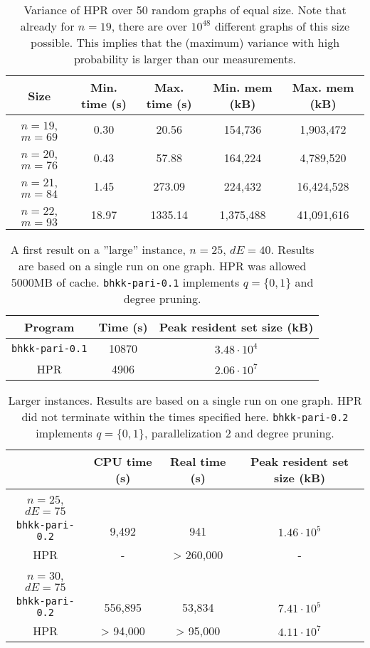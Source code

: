 \documentclass[a4paper]{article}
\newcommand{\code}{\texttt}
\begin{document}
\begin{table}[H]\centering
\begin{tabular}{ccccc} \hline
  Size 			& Min. time (s)	& Max. time (s)	& Min. mem (kB)	& Max. mem (kB) \\ \hline
  $n = 19$, $m = 69$ 	& 0.30 		& 20.56		& 154,736	& 1,903,472\\ \hline
  $n = 20$, $m = 76$ 	& 0.43 		& 57.88		& 164,224	& 4,789,520 \\ \hline
  $n = 21$, $m = 84$ 	& 1.45 		& 273.09	& 224,432	& 16,424,528 \\ \hline
  $n = 22$, $m = 93$ 	& 18.97		& 1335.14	& 1,375,488	& 41,091,616 \\ \hline
\end{tabular}
\caption{Variance of HPR over 50 random graphs of equal size. Note that already for $n = 19$, there are over $10^{48}$ different graphs of this size possible. This implies that the (maximum) variance with high probability is larger than our measurements.}
\label{variance}
\end{table}

\begin{table}[H]\centering
\begin{tabular}{|c|c|c|} \hline
  Program & Time (s) & Peak resident set size (kB) \\ \hline
  \code{bhkk-pari-0.1} & 10870 & $3.48 \cdot 10^{4}$ \\ \hline
  HPR & 4906 & $2.06 \cdot 10^{7}$ \\ \hline
\end{tabular}
\caption{A first result on a ''large'' instance, $n = 25$, $dE = 40$. Results are based on a single run on one graph. HPR was allowed 5000MB of cache. \code{bhkk-pari-0.1} implements $q = \{0, 1\}$ and degree pruning.}
\end{table}

\begin{table}[H]\centering
\begin{tabular}{|c|c|c|c|} \hline
  & CPU time (s) & Real time (s) & Peak resident set size (kB) \\ \hline
  $n = 25$, $dE = 75$ & & & \\ \hline
  \code{bhkk-pari-0.2} & 9,492 & 941 & $1.46 \cdot 10^{5}$ \\ \hline
  HPR & - & > 260,000 & - \\ \hline
  $n = 30$, $dE = 75$ &  &  &  \\ \hline
  \code{bhkk-pari-0.2} & 556,895 & 53,834 & $7.41 \cdot 10^{5}$ \\ \hline
  HPR & > 94,000 & > 95,000 & $4.11 \cdot 10^{7}$ \\ \hline
\end{tabular}
\caption{Larger instances. Results are based on a single run on one graph. HPR did not terminate within the times specified here. \code{bhkk-pari-0.2} implements $q = \{0, 1\}$, parallelization 2 and degree pruning.}
\end{table}
\end{document}
